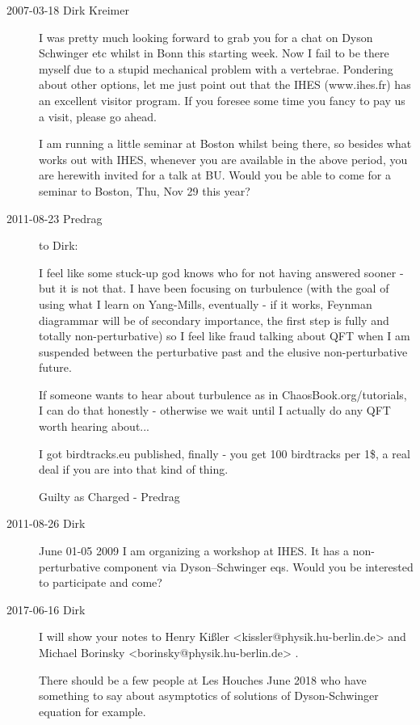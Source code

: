 \begin{description}

\item[2007-03-18 Dirk Kreimer] %
I was pretty much looking forward to grab you for a chat on Dyson
Schwinger etc whilst in Bonn this starting week. Now I fail to be there
myself due to a stupid mechanical problem with a vertebrae.
Pondering about other options, let me just point out that the IHES
(www.ihes.fr) has an excellent visitor program. If you foresee some time
you fancy to pay us a visit, please go ahead.

I am running a little seminar at Boston whilst being there, so besides
what works out with IHES,  whenever you are available in the above
period, you are herewith invited for a talk at BU.
Would you be able to come for a seminar to Boston, Thu, Nov 29 this year?

\item[2011-08-23 Predrag] to Dirk:

I feel like some stuck-up god knows who for not having answered sooner -
but it is not that. I have been focusing on turbulence (with the goal of
using what I learn on Yang-Mills, eventually - if it works, Feynman
diagrammar will be of secondary importance, the first step is fully and
totally non-perturbative) so I feel like fraud talking about QFT when I
am suspended between the perturbative past and the elusive
non-perturbative future.

If someone wants to hear about turbulence as in
 {ChaosBook.org/tutorials}, I can do
that honestly - otherwise we wait until I actually do any QFT worth
hearing about...

I got  {birdtracks.eu} published, finally -
you get 100 birdtracks per 1\$, a real deal if you are into that kind of
thing.

Guilty as Charged -
Predrag

\item[2011-08-26 Dirk]
June 01-05 2009 I am organizing a workshop at IHES. It has a
non-perturbative component via Dyson--Schwinger eqs. Would you be
interested to participate and come?

\item[2017-06-16 Dirk]
I will show your notes to
Henry Ki{\ss}ler   <kissler@physik.hu-berlin.de>
and
{Michael Borinsky}    <borinsky@physik.hu-berlin.de> .

There should be a few people at Les Houches June 2018 who have something
to say about asymptotics of solutions of Dyson-Schwinger equation for
example.


\end{description}


